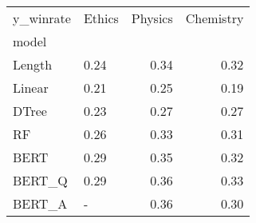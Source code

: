 \begin{tabular}{llrr}
\toprule
y\_winrate & Ethics &  Physics &  Chemistry \\
model  &        &          &            \\
\midrule
Length &   0.24 &     0.34 &       0.32 \\
Linear &   0.21 &     0.25 &       0.19 \\
DTree  &   0.23 &     0.27 &       0.27 \\
RF     &   0.26 &     0.33 &       0.31 \\
BERT   &   0.29 &     0.35 &       0.32 \\
BERT\_Q &   0.29 &     0.36 &       0.33 \\
BERT\_A &      - &     0.36 &       0.30 \\
\bottomrule
\end{tabular}
